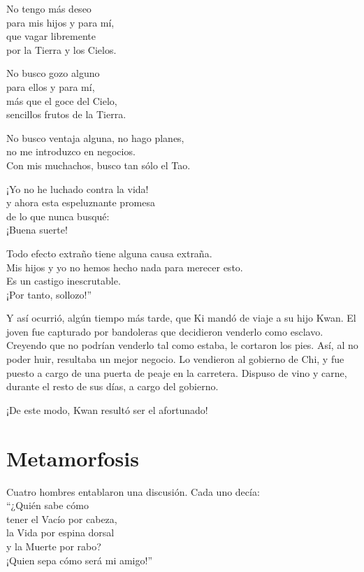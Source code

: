 \documentclass[book,b5paper,hidelinks,final]{memoir}
\begin{document}
	No tengo más deseo\\
	para mis hijos y para mí,\\
	que vagar libremente\\
	por la Tierra y los Cielos.
	
	No busco gozo alguno\\
	para ellos y para mí,\\
	más que el goce del Cielo,\\
	sencillos frutos de la Tierra.
	
	No busco ventaja alguna, no hago planes,\\
	no me introduzco en negocios.\\
	Con mis muchachos, busco tan sólo el Tao.
	
	¡Yo no he luchado contra la vida!\\
	y ahora esta espeluznante promesa\\
	de lo que nunca busqué:\\
	¡Buena suerte!
	
	Todo efecto extraño tiene alguna causa extraña.\\
	Mis hijos y yo no hemos hecho nada para merecer esto.\\
	Es un castigo inescrutable.\\
	¡Por tanto, sollozo!''
	
	Y así ocurrió, algún tiempo más tarde, que Ki mandó de viaje a su hijo
	Kwan. El joven fue capturado por bandoleras que decidieron venderlo como
	esclavo. Creyendo que no podrían venderlo tal como estaba, le cortaron
	los pies. Así, al no poder huir, resultaba un mejor negocio. Lo
	vendieron al gobierno de Chi, y fue puesto a cargo de una puerta de
	peaje en la carretera. Dispuso de vino y carne, durante el resto de sus
	días, a cargo del gobierno.
	
	¡De este modo, Kwan resultó ser el afortunado!
	
	\chapter*{Metamorfosis}
	
	Cuatro hombres entablaron una discusión. Cada uno decía:\\
	``¿Quién sabe cómo\\
	tener el Vacío por cabeza,\\
	la Vida por espina dorsal\\
	y la Muerte por rabo?\\
	¡Quien sepa cómo será mi amigo!''
	
\end{document}
